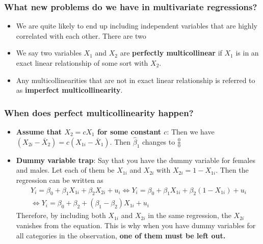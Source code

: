 \documentclass[aspectratio=169]{beamer}
\begin{document}
\begin{frame}
\frametitle{What new problems do we have in multivariate regressions?}
\begin{itemize}
\item We are quite likely to end up including independent variables that are highly correlated with each other. There are two \item We say two variables $X_1$ and $X_2$ are \textbf{perfectly multicollinear} if $X_1$ is in an exact linear relationship of some sort with $X_2$.
\item Any multicollinearities that are not in exact linear relationship is referred to as \textbf{imperfect multicollinearity}. 
\end{itemize}
\end{frame}

\begin{frame}
\frametitle{When does perfect multicollinearity happen?}
\begin{itemize}
\item \textbf{Assume that $X_2 = cX_1$ for some constant $c$}: Then we have $(X_{2i}-\bar{X}_2)=c(X_{1i}-\bar{X}_1)$. Then $\hat{\beta}_1$ changes to $\frac{0}{0} $ 
\item \textbf{Dummy variable trap}: Say that you have the dummy variable for females and males. Let each of them be $X_{1i}$ and $X_{2i}$ with $X_{2i}=1-X_{1i}$. Then the regression can be written as
\begin{gather*}
Y_i = \beta_0 + \beta_1X_{1i} + \beta_2X_{2i} + u_i \iff Y_i = \beta_0 + \beta_1X_{1i} + \beta_2(1-X_{1i}) + u_i \\
\iff Y_i = \beta_0 + \beta_2 +(\beta_1-\beta_2)X_{1i}+u_i
\end{gather*}
Therefore, by including both $X_{1i}$ and $X_{2i}$ in the same regression, the $X_{2i}$ vanishes from the equation. This is why when you have dummy variables for all categories in the observation, \textbf{one of them must be left out.}
\end{itemize}
\end{frame}
\end{document}
